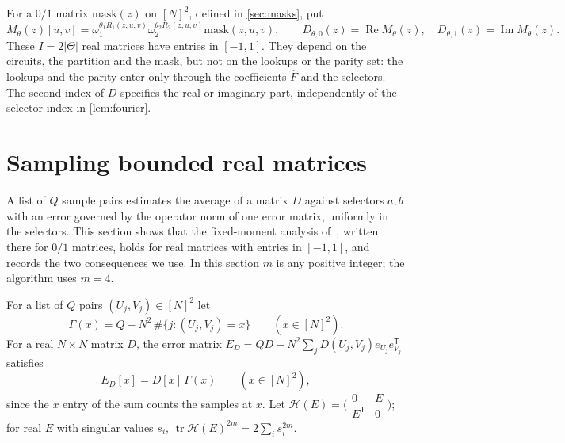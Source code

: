 \documentclass[11pt,letterpaper]{article}
\theoremstyle{definition}
\theoremstyle{remark}
\newcommand{\E}{\mathbb E}
\newcommand{\tr}{\operatorname{tr}}
\newcommand{\mask}{\mathrm{mask}}
\newcommand{\cH}{\mathcal H}
\begin{document}
For a \(0/1\) matrix \(\mask(z)\) on \([N]^2\), defined in
\cref{sec:masks}, put
\[
 M_\theta(z)[u,v]=\omega_1^{\theta_1R_1(z,u,v)}\omega_2^{\theta_2R_2(z,u,v)}\mask(z,u,v),\qquad
 D_{\theta,0}(z)=\operatorname{Re}M_\theta(z),\quad D_{\theta,1}(z)=\operatorname{Im}M_\theta(z).
\]
These \(I=2|\Theta|\) real matrices have entries in \([-1,1]\). They
depend on the circuits, the partition and the mask, but not on the
lookups or the parity set: the lookups and the parity enter only
through the coefficients \(\widehat F\) and the selectors.
The second index of \(D\) specifies the real or imaginary part,
independently of the selector index in \cref{lem:fourier}.

\section{Sampling bounded real matrices}\label{sec:sampler}

A list of \(Q\) sample pairs estimates the average of a matrix
\(D\) against selectors \(a,b\) with an error governed by the operator
norm of one error matrix, uniformly in the selectors. This section
shows that the fixed-moment analysis of~\cite[Lemma~F.1]{Nag72},
written there for \(0/1\) matrices, holds for real matrices with
entries in \([-1,1]\), and records the two consequences we use. In
this section \(m\) is any positive integer; the algorithm uses
\(m=4\).

For a list of \(Q\) pairs \((U_j,V_j)\in[N]^2\) let
\[
 \Gamma(x)=Q-N^2\,\#\{j:(U_j,V_j)=x\}\qquad(x\in[N]^2).
\]
For a real \(N\times N\) matrix \(D\), the error matrix
\(E_D=QD-N^2\sum_jD(U_j,V_j)e_{U_j}e_{V_j}^{\mathsf T}\) satisfies
\begin{equation}\label{eq:ED}
 E_D[x]=D[x]\,\Gamma(x)\qquad(x\in[N]^2),
\end{equation}
since the \(x\) entry of the sum counts the samples at \(x\). Let
\(\cH(E)=\bigl(\begin{smallmatrix}0&E\\E^{\mathsf T}&0\end{smallmatrix}\bigr)\);
for real \(E\) with singular values \(s_i\),
\(\tr\cH(E)^{2m}=2\sum_is_i^{2m}\).
\end{document}
